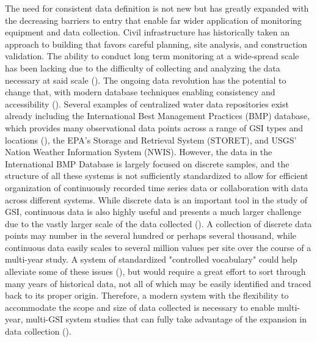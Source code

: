 The need for consistent data definition is not new but has greatly expanded with the decreasing barriers to entry that enable far wider application of monitoring equipment and data collection.
Civil infrastructure has historically taken an approach to building that favors careful planning, site analysis, and construction validation.
The ability to conduct long term monitoring at a wide-spread scale has been lacking due to the difficulty of collecting and analyzing the data necessary at said scale (\cite{DelGrosso2019}).
The ongoing data revolution has the potential to change that, with modern database techniques enabling consistency and accessibility (\cite{Maidment2008,Abdallah2019}).
Several examples of centralized water data repositories exist already including the International Best Management Practices (BMP) database, which provides many observational data points across a range of GSI types and locations (\cite{LIDCenter2004}), the EPA's Storage and Retrieval System (STORET), and USGS' Nation Weather Information System (NWIS).
However, the data in the International BMP Database is largely focused on discrete samples, and the structure of all these systems is not sufficiently standardized to allow for efficient organization of continuously recorded time series data or collaboration with data across different systems.
While discrete data is an important tool in the study of GSI, continuous data is also highly useful and presents a much larger challenge due to the vastly larger scale of the data collected (\cite{Wadzuk2021a}).
A collection of discrete data points may number in the several hundred or perhaps several thousand, while continuous data easily scales to several million values per site over the course of a multi-year study.
A system of standardized "controlled vocabulary" could help alleviate some of these issues (\cite{Maidment2008}), but would require a great effort to sort through many years of historical data, not all of which may be easily identified and traced back to its proper origin.
Therefore, a modern system with the flexibility to accommodate the scope and size of data collected is necessary to enable multi-year, multi-GSI system studies that can fully take advantage of the expansion in data collection (\cite{Wadzuk2021,Meng2017}).

